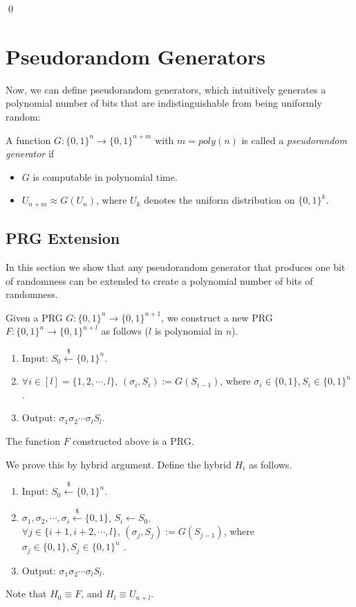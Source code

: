 \documentclass[12pt]{tufte-book}
\begin{document}
\qed


\fi



\section{Pseudorandom Generators}
Now, we can define pseudorandom generators, which intuitively generates a polynomial number of bits that are indistinguishable from being uniformly random:
\begin{definition}
A function $G:\{0,1\}^n\rightarrow \{0,1\}^{n+m}$ with $m = poly(n)$ is called a \emph{pseudorandom generator} if
\begin{itemize}
\item $G$ is computable in polynomial time.
\item $U_{n+m}\approx G(U_n)$, where $U_k$ denotes the uniform distribution on $\{0,1\}^k$.
\end{itemize}
\end{definition}


\subsection{PRG Extension}
In this section we show that any pseudorandom generator that produces one bit of randomness can be extended to create a polynomial number of bits of randomness.

\begin{construction}
Given a PRG $G: \{0, 1\}^n \rightarrow \{0, 1\} ^ {n+1}$,
we construct a new PRG $F: \{0, 1\}^n \rightarrow \{0, 1\} ^{n+l}$ as follows ($l$ is polynomial in $n$).
\begin{enumerate}[label=(\alph*)]
    \item Input: $S_0 \xleftarrow{\$} \{0, 1\}^n$.
    \item $\forall i \in [l] = \{1, 2, \cdots, l\}$, $(\sigma_i, S_i) := G(S_{i-1})$, where $\sigma_i \in \{0, 1\}, S_i \in \{0, 1\}^n$ .
    \item Output: $\sigma_1 \sigma_2 \cdots \sigma_l S_l$.
\end{enumerate}
\end{construction}

\begin{theorem}
The function $F$ constructed above is a PRG.
\end{theorem}

\proof
We prove this by hybrid argument. Define the hybrid $H_i$ as follows.
\begin{enumerate}[label=(\alph*)]
	\item Input: $S_0 \xleftarrow{\$} \{0, 1\}^n$.
    \item $\sigma_1, \sigma_2, \cdots, \sigma_i \xleftarrow{\$} \{0, 1\}$, $S_i \gets S_0$.\\
     $\forall j \in \{i+1, i+2, \cdots, l\}$, $(\sigma_j, S_j) := G(S_{j-1})$, where $\sigma_j \in \{0, 1\}, S_j \in \{0, 1\}^n$ .
    \item Output: $\sigma_1 \sigma_2 \cdots \sigma_l S_l$.
\end{enumerate}
Note that $H_0 \equiv F$, and $H_l \equiv U_{n+l}$.
\end{document}
